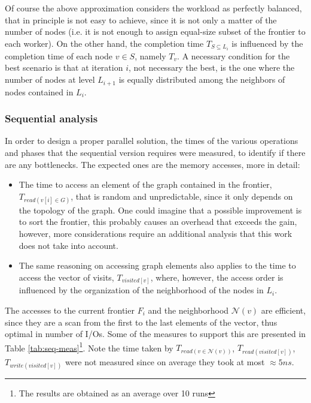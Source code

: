 Of course the above approximation considers the workload as perfectly balanced,
that in principle is not easy to achieve, since it is not only
a matter of the number of nodes (i.e. it is not enough to assign equal-size
subset of the frontier to each worker). On the other hand, the completion time $T_{S \subseteq L_i}$
is influenced by the completion time of each node $v \in S$, namely $T_v$. A necessary condition for the best scenario is that at iteration $i$, not necessary the best,
is the one where the number of nodes at level $L_{i+1}$ is equally
distributed among the neighbors of nodes contained in $L_i$.
\subsubsection{Sequential analysis}
In order to design a proper parallel solution, 
the times of the various operations and phases that the sequential
 version requires were measured, to identify if there are any bottlenecks.
The expected ones are the memory accesses, more in detail:
\begin{itemize}
    \item The time to access an element of the graph contained in the frontier,
    $T_{read(v[i]\in G)}$, that is 
    random and unpredictable, since it only depends on the topology of the graph. One could
    imagine that a possible improvement is to sort the frontier, this probably causes
    an overhead that exceeds the gain, however, more 
    considerations require an additional 
    analysis that this work does not take into account.
    \item The same reasoning on accessing graph elements
     also applies to the time to access the vector of visits, $T_{visited[v]}$, where, however, 
    the access order is influenced by the organization of the neighborhood 
    of the nodes in $L_i$.
\end{itemize}
The accesses to the current frontier $F_i$ and the neighborhood $\mathcal{N}(v)$ are efficient, since they are a scan from the 
first to the last elements
of the vector, thus optimal in number of I/Os. Some of
 the measures to support this are presented in Table \ref{tab:seq-meas}\footnote{The results are obtained as an average over 10 runs}. Note the time taken by $T_{read(v \in \mathcal{N}(v))}$, $T_{read(visited[v])}$, $T_{write(visited[v])}$ were not measured since on average they took at most $\approx 5ns$.


